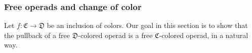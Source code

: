 \documentclass[a4paper,10pt
,draft
]{article}%
\renewcommand{\hat}{\widehat}
\renewcommand{\1}{\eta}%
\begin{document}

        



\subsubsection{Free operads and change of color}


Let $f \colon \mathfrak{C} \to \mathfrak{D}$ be an inclusion of colors.
Our goal in this section is to show that the pullback of a free $\mathfrak{D}$-colored operad is a free $\mathfrak{C}$-colored operad, in a natural way.
\end{document}
